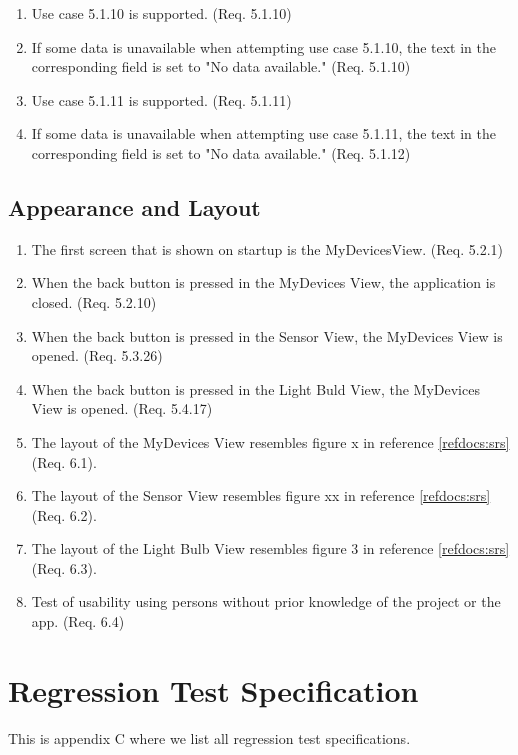 \documentclass[a4paper]{article}
\newlength{\testlabellength}
\newenvironment{testlist}{\begin{enumerate}[label=\bfseries Test \thesubsection.\arabic* , labelindent=0pt, labelwidth=\testlabellength , leftmargin=2cm]}{\end{enumerate}}
\begin{document}
\begin{appendices}
\begin{testlist}
	\item Use case 5.1.10 is supported. (Req. 5.1.10)
	
	\item If some data is unavailable when attempting use case 5.1.10, the text in the corresponding field is set to "No data available." (Req. 5.1.10)
	
	\item Use case 5.1.11 is supported. (Req. 5.1.11)
	
	\item If some data is unavailable when attempting use case 5.1.11, the text in the corresponding field is set to "No data available." (Req. 5.1.12)
\end{testlist}

\subsection{Appearance and Layout}

\begin{testlist}
	\item The first screen that is shown on startup is the MyDevicesView. (Req. 5.2.1)
	
	\item When the back button is pressed in the MyDevices View, the application is closed. (Req. 5.2.10)	
	
	\item When the back button is pressed in the Sensor View, the MyDevices View is opened. (Req. 5.3.26)
	
	\item When the back button is pressed in the Light Buld View, the MyDevices View is opened. (Req. 5.4.17)
	
	\item The layout of the MyDevices View resembles figure x in reference \ref{refdocs:srs} (Req. 6.1).
	
	\item The layout of the Sensor View resembles figure xx in reference \ref{refdocs:srs} (Req. 6.2).
	\item The layout of the Light Bulb View resembles figure 3 in reference \ref{refdocs:srs} (Req. 6.3).
	
	\item Test of usability using persons without prior knowledge of the project or the app. (Req. 6.4)
\end{testlist}

\newpage
\section{Regression Test Specification}
This is appendix C where we list all regression test specifications.

\end{appendices}
\end{document}
